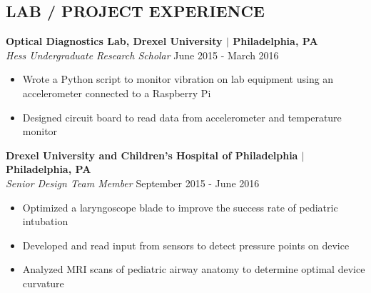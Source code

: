 \documentclass[line,resmargin,11pt]{res}
\begin{document}
\begin{resume}
\section{LAB / PROJECT EXPERIENCE}
\textbf{Optical Diagnostics Lab, Drexel University $|$ Philadelphia, PA} \\
{\sl Hess Undergraduate Research Scholar} \hfill June 2015 - March 2016
	\begin{itemize}  \itemsep -2pt %
		\item  Wrote a Python script to monitor vibration on lab equipment using an accelerometer connected to a Raspberry Pi
		\item  Designed circuit board to read data from accelerometer and temperature monitor
	\end{itemize}

\textbf{Drexel University and Children's Hospital of Philadelphia $|$ Philadelphia, PA} \\
{\sl Senior Design Team Member} \hfill September 2015 - June 2016 \\
\begin{itemize} \itemsep -2pt
	\item  Optimized a laryngoscope blade to improve the success rate of pediatric intubation
	\item  Developed and read input from sensors to detect pressure points on device
	\item  Analyzed MRI scans of pediatric airway anatomy to determine optimal device curvature
\end{itemize}

\end{resume}
\end{document}
